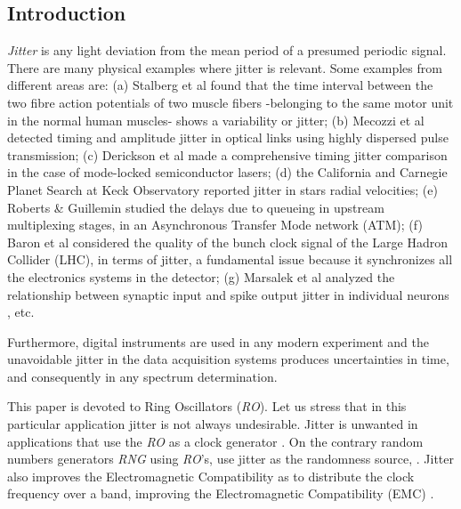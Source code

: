 \subsection{Introduction}
\label{sec:intro}

%
\emph{Jitter} is any light deviation from the mean period of a presumed periodic signal. There are many physical examples where jitter is relevant. Some examples from different areas are:
(a) Stalberg et al \cite{Stalberg1971} found that the time interval between the two fibre action potentials of two muscle fibers -belonging to the same motor unit in the normal human muscles- shows a variability or jitter; (b) Mecozzi et al \cite{Mecozzi2001} detected timing and amplitude jitter in optical links using highly dispersed pulse transmission; (c) Derickson et al \cite{Derickson1991} made a comprehensive timing jitter comparison in the case of mode-locked semiconductor lasers; (d) the California and Carnegie Planet Search at Keck Observatory \cite{Wright2005} reported jitter in stars radial velocities; (e) Roberts \& Guillemin studied the delays  due to queueing in upstream multiplexing stages, in an Asynchronous Transfer Mode network (ATM); (f) Baron et al  \cite{Baron2012} considered the quality of the bunch clock signal of the Large Hadron Collider (LHC), in terms of jitter, a fundamental issue because it synchronizes all the electronics systems in the detector; (g) Marsalek et al analyzed the relationship between synaptic input and spike output jitter in individual neurons \cite{Marsalek1997}, etc. 

Furthermore, digital instruments are used in any modern experiment and the unavoidable jitter in the data acquisition systems produces uncertainties in time, and consequently in any spectrum determination. 

This paper is devoted to Ring Oscillators (\emph{RO}). Let us stress that in this particular application jitter is not always undesirable. Jitter is unwanted in applications that use the \emph{RO} as a clock generator \cite{Buedo1998,Beomsup1990,Hajimiri1999,Mandal2010,Gupta2011}. On the contrary random numbers generators \emph{RNG} using \emph{RO}'s, use jitter as the randomness source, \cite{Sunar2007,Wold2009}. Jitter also improves the Electromagnetic Compatibility as to distribute the clock frequency over a band, improving the Electromagnetic Compatibility (EMC) \cite{DeMicco2012}.

